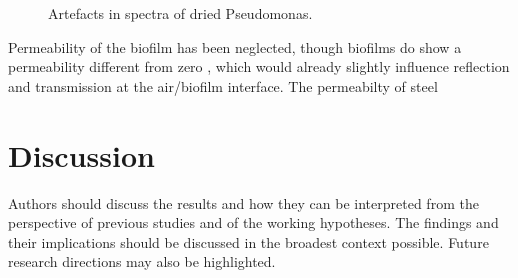 \documentclass[foods,article,submit,moreauthors,pdftex]{Definitions/mdpi}
\begin{document}
\begin{figure}[ht]
  \caption{Artefacts in spectra of dried Pseudomonas.}
 
 \label{fig:sp_atrefacts}
\end{figure}
Permeability of the biofilm has been neglected, though biofilms do show a permeability different from zero \cite{Vogt_PermeabilityBiofilm_2013}, which would already slightly influence reflection and transmission at the air/biofilm interface. The permeabilty of steel 



\section{Discussion}

Authors should discuss the results and how they can be interpreted from the perspective of previous studies and of the working hypotheses. The findings and their implications should be discussed in the broadest context possible. Future research directions may also be highlighted.
\end{document}
